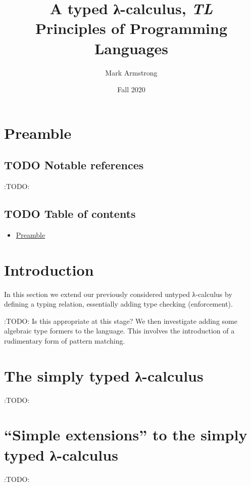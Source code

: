 \documentclass[11pt]{article}
\author{Mark Armstrong}
\date{Fall 2020}
\title{A typed λ-calculus, \emph{TL}\\\medskip
\large Principles of Programming Languages}
\theoremstyle{definition}
\begin{document}
\maketitle

\section{Preamble}
\label{sec:org8877e6f}

\subsection{{\bfseries\sffamily TODO} Notable references}
\label{sec:orge885cea}

:TODO:

\subsection{{\bfseries\sffamily TODO} Table of contents}
\label{sec:org9df50d8}

\begin{scriptsize}
\begin{itemize}
\item \hyperref[sec:org8877e6f]{Preamble}
\end{itemize}
\end{scriptsize}

\section{Introduction}
\label{sec:org8937597}

In this section we extend our previously considered
untyped λ-calculus by defining a typing relation,
essentially adding type checking (enforcement).

:TODO: Is this appropriate at this stage?
We then investigate adding some
algebraic type formers to the language.
This involves the introduction of a rudimentary form
of pattern matching.
\section{The simply typed λ-calculus}
\label{sec:orga655db1}

:TODO:

\section{“Simple extensions” to the simply typed λ-calculus}
\label{sec:orgb1865b9}

:TODO:
\end{document}
